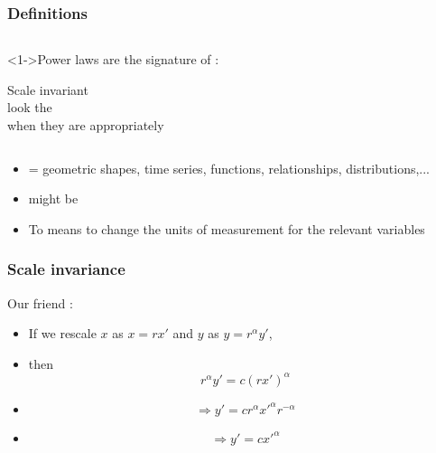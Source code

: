 \begin{frame}
  \frametitle{Definitions}

  \begin{columns}
    \begin{block}<1->{Power laws are the signature of :}
      \bigskip

      Scale invariant \\
      look the \\ 
      when they are 
      appropriately 
    \end{block}
  \end{columns}

  \bigskip

  \begin{block}{}
    \begin{itemize}
    \item<2-> 
       = geometric shapes, time series, functions, relationships, distributions,...
    \item<3-> 
       might be 
    \item<4-> 
      To  means to change the units
      of measurement for the relevant variables
    \end{itemize}
  \end{block}

\end{frame}

\begin{frame}
  \frametitle{Scale invariance}

  \begin{block}{Our friend :}
    \begin{itemize}
    \item<1->
      If we rescale $x$ as $x = rx'$ and $y$ as $y = r^\alpha y'$,
    \item<2->
      then
      $$r^\alpha y' = c (rx')^{\alpha}$$
    \item<3->
      $$\Rightarrow y' = c r^{\alpha} {x'}^{\alpha}r^{-\alpha}$$
    \item<4->
      $$\Rightarrow y' = c {x'}^{\alpha}$$
    \end{itemize}
  \end{block}

\end{frame}

